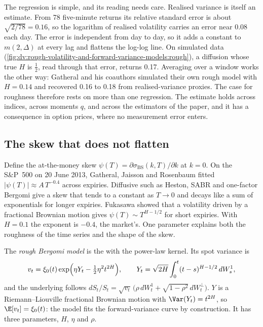 The regression is simple, and its reading needs care. Realised variance is itself an estimate. From 78
five-minute returns its relative standard error is about $\sqrt{2/78}=0.16$, so the logarithm of realised
volatility carries an error near 0.08 each day. The error is independent from day to day, so it adds a
constant to $m(2,\Delta)$ at every lag and flattens the log-log line. On simulated data
(\cref{fig:dv:rough-volatility-and-forward-variance-models:rough}), a diffusion whose true $H$ is $\frac12$,
read through that error, returns 0.17. Averaging over a window works the other way: Gatheral and his
coauthors simulated their own rough model with $H=0.14$ and recovered 0.16 to 0.18 from realised-variance
proxies. The case for roughness therefore rests on more than one regression. The estimate holds across
indices, across moments $q$, and across the estimators of the paper, and it has a consequence in option
prices, where no measurement error enters.

\subsection{The skew that does not flatten}

Define the at-the-money skew $\psi(T)=\partial\sigma_{\mathrm{BS}}(k,T)/\partial k$ at $k=0$. On the S\&P~500
on 20 June 2013, Gatheral, Jaisson and Rosenbaum fitted $|\psi(T)|\approx A\,T^{-0.4}$ across expiries.
Diffusive  such as Heston, SABR and one-factor Bergomi give a skew that tends to
a constant as $T\to0$ and decays like a sum of exponentials for longer expiries. Fukasawa showed that a
volatility driven by a fractional Brownian motion gives $\psi(T)\sim T^{H-1/2}$ for short expiries. With
$H=0.1$ the exponent is $-0.4$, the market's. One parameter explains both the roughness of the time series
and the shape of the skew.

\begin{definition}\label{def:dv:rough-volatility-and-forward-variance-models:rbergomi}
The \emph{rough Bergomi model} is the  with the power-law
kernel. Its spot variance is
\[
v_t=\xi_0(t)\exp\Bigl(\eta Y_t-\tfrac12\eta^2t^{2H}\Bigr),\qquad Y_t=\sqrt{2H}\int_0^t(t-s)^{H-1/2}\,dW^1_s,
\]
and the underlying follows $dS_t/S_t=\sqrt{v_t}\,\bigl(\rho\,dW^1_t+\sqrt{1-\rho^2}\,dW^\perp_t\bigr)$. $Y$
is a Riemann--Liouville fractional Brownian motion with $\Var(Y_t)=t^{2H}$, so $\E[v_t]=\xi_0(t)$: the model
fits the forward-variance curve by construction. It has three parameters, $H$, $\eta$ and $\rho$.
\end{definition}

